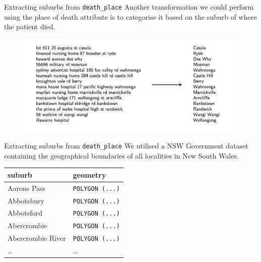 \documentclass[]{beamer}
\begin{document}

\begin{frame}[fragile]{Extracting suburbs from \texttt{death\_place}}
	Another transformation we could perform using the place of death attribute is to categorise it based on the suburb of where the patient died.

	\begin{figure}
		\includegraphics[width=\textwidth]{img/suburb_categorisation.png}
	\end{figure}
\end{frame}

\begin{frame}[fragile]{Extracting suburbs from \texttt{death\_place}}
	We utilised a NSW Government dataset containing the geographical boundaries of all localities in New South Wales.	
	\vspace{1em}
	\begin{table}[]
		\begin{tabular}{@{}ll@{}}
		\toprule
		suburb      & geometry      \\ \midrule
		Aarons Pass & \texttt{POLYGON (...)} \\
		Abbotsbury  & \texttt{POLYGON (...)} \\
		Abbotsford  & \texttt{POLYGON (...)} \\
		Abercrombie & \texttt{POLYGON (...)} \\ 
		Abercrombie River & \texttt{POLYGON (...)} \\
		\ldots & \ldots \\ \bottomrule
		\end{tabular}
	\end{table}

\end{frame}
\end{document}
